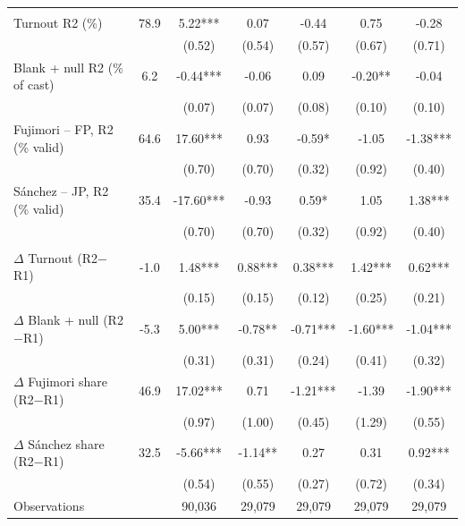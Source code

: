 \begin{tabular}{lcccccc}
\addlinespace
\multicolumn{7}{l}{\emph{Panel B: Second round}} \\
Turnout R2 (\%) & 78.9 & 5.22*** & 0.07 & -0.44 & 0.75 & -0.28 \\
 &  & (0.52) & (0.54) & (0.57) & (0.67) & (0.71) \\[1pt]
Blank + null R2 (\% of cast) & 6.2 & -0.44*** & -0.06 & 0.09 & -0.20** & -0.04 \\
 &  & (0.07) & (0.07) & (0.08) & (0.10) & (0.10) \\[1pt]
Fujimori -- FP, R2 (\% valid) & 64.6 & 17.60*** & 0.93 & -0.59* & -1.05 & -1.38*** \\
 &  & (0.70) & (0.70) & (0.32) & (0.92) & (0.40) \\[1pt]
S\'anchez -- JP, R2 (\% valid) & 35.4 & -17.60*** & -0.93 & 0.59* & 1.05 & 1.38*** \\
 &  & (0.70) & (0.70) & (0.32) & (0.92) & (0.40) \\[1pt]
\addlinespace
\multicolumn{7}{l}{\emph{Panel C: Within-mesa change}} \\
$\Delta$ Turnout (R2$-$R1) & -1.0 & 1.48*** & 0.88*** & 0.38*** & 1.42*** & 0.62*** \\
 &  & (0.15) & (0.15) & (0.12) & (0.25) & (0.21) \\[1pt]
$\Delta$ Blank + null (R2$-$R1) & -5.3 & 5.00*** & -0.78** & -0.71*** & -1.60*** & -1.04*** \\
 &  & (0.31) & (0.31) & (0.24) & (0.41) & (0.32) \\[1pt]
$\Delta$ Fujimori share (R2$-$R1) & 46.9 & 17.02*** & 0.71 & -1.21*** & -1.39 & -1.90*** \\
 &  & (0.97) & (1.00) & (0.45) & (1.29) & (0.55) \\[1pt]
$\Delta$ S\'anchez share (R2$-$R1) & 32.5 & -5.66*** & -1.14** & 0.27 & 0.31 & 0.92*** \\
 &  & (0.54) & (0.55) & (0.27) & (0.72) & (0.34) \\[1pt]
\addlinespace
\midrule
Observations &  & 90,036 & 29,079 & 29,079 & 29,079 & 29,079 \\
\bottomrule
\end{tabular}